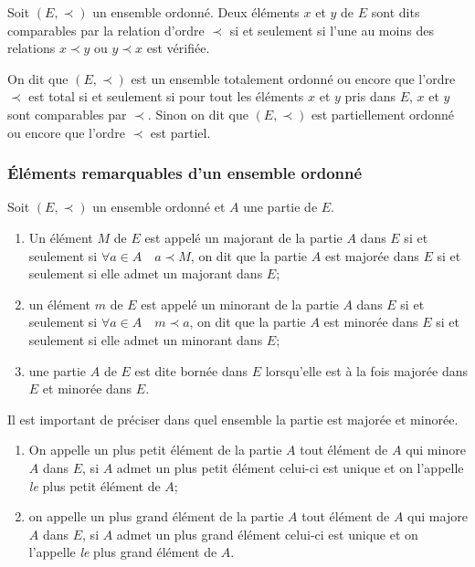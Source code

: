 \begin{defdef}
  Soit \((E, \prec)\) un ensemble ordonné. Deux éléments \(x\) et \(y\) de
  \(E\) sont dits comparables par la relation d'ordre \(\prec\) si et
  seulement si l'une au moins des relations \(x \prec y\) ou \(y \prec x\) est
  vérifiée.
\end{defdef}

\begin{defdef}
  On dit que \((E, \prec)\) est un ensemble totalement ordonné ou encore que
  l'ordre \(\prec\) est total si et seulement si pour tout les éléments \(x\)
  et \(y\) pris dans \(E\), \(x\) et \(y\) sont comparables par \(\prec\).
  Sinon on dit que \((E, \prec)\) est partiellement ordonné ou encore que
  l'ordre \(\prec\) est partiel.
\end{defdef}

\subsubsection{Éléments remarquables d'un ensemble
ordonné}\label{chap3-subsubsec:elementremarquables}

Soit \((E,\prec)\) un ensemble ordonné et \(A\) une partie de \(E\).
\begin{defdef}
  \begin{enumerate}
    \item Un élément \(M\) de \(E\) est appelé un majorant de la partie
      \(A\) dans \(E\) si et seulement si \(\forall{}a \in{}A \quad a \prec
      M\), on dit que la partie \(A\) est majorée dans \(E\) si et
      seulement si elle admet un majorant dans \(E\);
    \item un élément \(m\) de \(E\) est appelé un minorant de la partie
      \(A\) dans \(E\) si et seulement si \(\forall{}a \in{}A \quad m \prec
      a\), on dit que la partie \(A\) est minorée dans \(E\) si et
      seulement si elle admet un minorant dans \(E\);
    \item une partie \(A\) de \(E\) est dite bornée dans \(E\) lorsqu'elle
      est à la fois majorée dans \(E\) et minorée dans \(E\).
  \end{enumerate}
  Il est important de préciser dans quel ensemble la partie est majorée et
  minorée.
\end{defdef}

\begin{defdef}
  \begin{enumerate}
    \item On appelle un plus petit élément de la partie \(A\) tout élément
      de \(A\) qui minore \(A\) dans \(E\), si \(A\) admet un plus petit
      élément celui-ci est unique et on l'appelle \emph{le} plus petit
      élément de \(A\);
    \item on appelle un plus grand élément de la partie \(A\) tout élément
      de \(A\) qui majore \(A\) dans \(E\), si \(A\) admet un plus grand
      élément celui-ci est unique et on l'appelle \emph{le} plus grand
      élément de \(A\).
  \end{enumerate}
\end{defdef}

